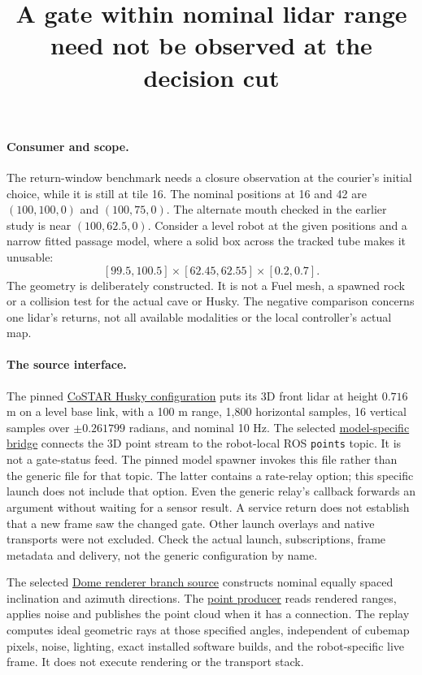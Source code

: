 \documentclass[11pt]{article}
\title{A gate within nominal lidar range need not be observed at the decision cut}
\author{}\date{}
\begin{document}
\maketitle

\paragraph{Consumer and scope.}
The return-window benchmark needs a closure observation at the
courier's initial choice, while it is still at tile 16. The
nominal positions at 16 and 42 are $(100,100,0)$ and $(100,75,0)$.
The alternate mouth checked in the earlier study is near
$(100,62.5,0)$. Consider a level robot at the given positions and
a narrow fitted passage model, where a solid box across the tracked
tube makes it unusable:
\[
[99.5,100.5]\times[62.45,62.55]\times[0.2,0.7] .
\]
The geometry is deliberately constructed. It is not a Fuel mesh,
a spawned rock or a collision test for the actual cave or Husky.
The negative comparison concerns one lidar's returns, not all
available modalities or the local controller's actual map.

\paragraph{The source interface.}
The pinned \href{https://github.com/osrf/subt/blob/083c6a8acb0c25aa1a35e34517e628cd3b52ae77/submitted_models/costar_husky_sensor_config_1/model.sdf}
{CoSTAR Husky configuration} puts its 3D front lidar at height
$0.716$ m on a level base link, with a 100 m range, 1,800 horizontal
samples, 16 vertical samples over $\pm0.261799$ radians, and nominal
10 Hz. The selected \href{https://github.com/osrf/subt/blob/083c6a8acb0c25aa1a35e34517e628cd3b52ae77/submitted_models/costar_husky_sensor_config_1/launch/vehicle_topics.launch}
{model-specific bridge} connects the 3D point stream to the
robot-local ROS \texttt{points} topic. It is not a gate-status
feed. The pinned model spawner invokes this file rather than
the generic file for that topic. The latter contains a rate-relay
option; this specific launch does not include that option.
Even the generic relay's callback forwards an argument without
waiting for a sensor result. A service return does not establish
that a new frame saw the changed gate. Other launch overlays and
native transports were not excluded. Check the actual launch,
subscriptions, frame metadata and delivery, not the generic
configuration by name.

The selected \href{https://github.com/gazebosim/gz-rendering/blob/4d0043361a135b7e43e0583516f1b3ddca9f434d/ogre2/src/Ogre2GpuRays.cc}
{Dome renderer branch source} constructs nominal equally spaced
inclination and azimuth directions. The
\href{https://github.com/gazebosim/gz-sensors/blob/b7148d659ea430e93b9b1b14f3b8162386636a58/src/GpuLidarSensor.cc}
{point producer} reads rendered ranges, applies noise and publishes
the point cloud when it has a connection. The replay computes ideal
geometric rays at those specified angles, independent of cubemap
pixels, noise, lighting, exact installed software builds, and
the robot-specific live frame. It does not execute rendering or
the transport stack.
\end{document}

